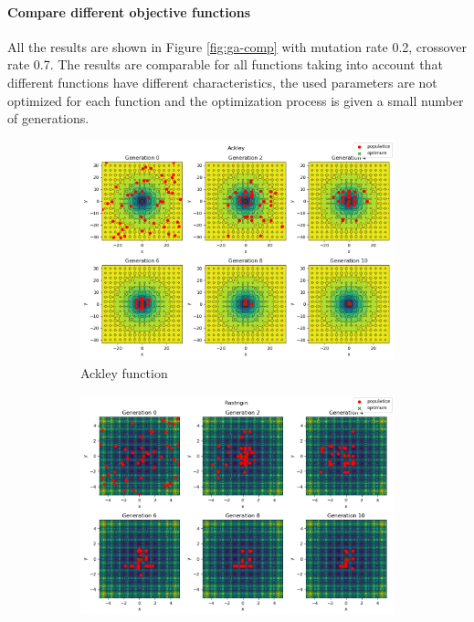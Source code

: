 \paragraph*{Compare different objective functions}
All the results are shown in Figure \ref{fig:ga-comp} with mutation rate 0.2, crossover rate 0.7. The results are comparable for all functions taking into account that different functions have different characteristics, the used parameters are not optimized for each function and the optimization process is given a small number of generations.
\begin{figure}[H]
    \begin{subfigure}{0.5\textwidth}
        \includegraphics[width=\textwidth]{lab7/imgs/ga_ackley.png}
        \caption{Ackley function}
    \end{subfigure}
    \begin{subfigure}{0.5\textwidth}
        \includegraphics[width=\textwidth]{lab7/imgs/ga_rastrigin.png}

\end{subfigure}
\end{figure}

